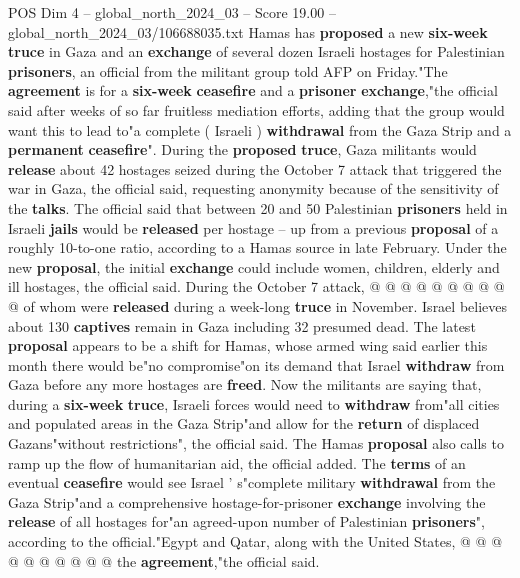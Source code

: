 \begin{textsample}{POS Dim 4 – global\_north\_2024\_03 – Score 19.00 – global\_north\_2024\_03/106688035.txt}  \label{ex:f4_pos_246}
Hamas has \textbf{proposed} a new \textbf{six-week} \textbf{truce} in Gaza and an \textbf{exchange} of several dozen Israeli hostages for Palestinian \textbf{prisoners}, an official from the militant group told AFP on Friday."The \textbf{agreement} is for a \textbf{six-week} \textbf{ceasefire} and a \textbf{prisoner} \textbf{exchange},"the official said after weeks of so far fruitless mediation efforts, adding that the group would want this to lead to"a complete ( Israeli ) \textbf{withdrawal} from the Gaza Strip and a \textbf{permanent} \textbf{ceasefire}".
During the \textbf{proposed} \textbf{truce}, Gaza militants would \textbf{release} about 42 hostages seized during the October 7 attack that triggered the war in Gaza, the official said, requesting anonymity because of the sensitivity of the \textbf{talks}.
The official said that between 20 and 50 Palestinian \textbf{prisoners} held in Israeli \textbf{jails} would be \textbf{released} per hostage -- up from a previous \textbf{proposal} of a roughly 10-to-one ratio, according to a Hamas source in late February.
Under the new \textbf{proposal}, the initial \textbf{exchange} could include women, children, elderly and ill hostages, the official said.
During the October 7 attack, @ @ @ @ @ @ @ @ @ @ of whom were \textbf{released} during a week-long \textbf{truce} in November.
Israel believes about 130 \textbf{captives} remain in Gaza including 32 presumed dead.
The latest \textbf{proposal} appears to be a shift for Hamas, whose armed wing said earlier this month there would be"no compromise"on its demand that Israel \textbf{withdraw} from Gaza before any more hostages are \textbf{freed}.
Now the militants are saying that, during a \textbf{six-week} \textbf{truce}, Israeli forces would need to \textbf{withdraw} from"all cities and populated areas in the Gaza Strip"and allow for the \textbf{return} of displaced Gazans"without restrictions", the official said.
The Hamas \textbf{proposal} also calls to ramp up the flow of humanitarian aid, the official added.
The \textbf{terms} of an eventual \textbf{ceasefire} would see Israel ' s"complete military \textbf{withdrawal} from the Gaza Strip"and a comprehensive hostage-for-prisoner \textbf{exchange} involving the \textbf{release} of all hostages for"an agreed-upon number of Palestinian \textbf{prisoners}", according to the official."Egypt and Qatar, along with the United States, @ @ @ @ @ @ @ @ @ @ the \textbf{agreement},"the official said.

\end{textsample}
